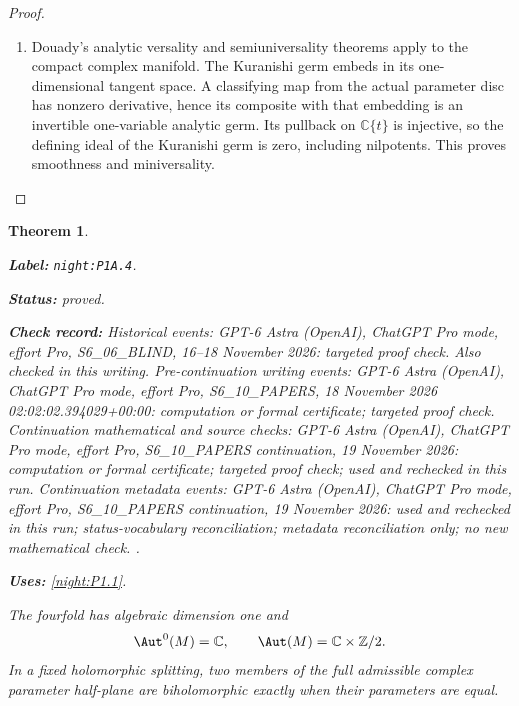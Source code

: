 \documentclass[11pt,a4paper]{article}
\newtheorem{theorem}{Theorem}[section]
\theoremstyle{definition}
\newcommand{\StatementRecord}[4]{\par\smallskip\begingroup\upshape\raggedright\noindent\textbf{Label:} \nolinkurl{#1}.\par\noindent\textbf{Status:} #2.\par\noindent\textbf{Check record:} #3.\par\noindent\textbf{Uses:} #4.\par\endgroup\smallskip}
\begin{document}
\begin{proof}
\begin{enumerate}[label=\arabic*.]
\item Douady's analytic versality and semiuniversality theorems
\cite[\S VII.8, pp.~598--599; \S VIII.1, pp.~599--600]{Douady1974} apply to the
compact complex manifold. The Kuranishi germ embeds in its
one-dimensional tangent space. A classifying map from the
actual parameter disc has nonzero derivative, hence its
composite with that embedding is an invertible one-variable
analytic germ. Its pullback on $\mathbb C\{t\}$ is injective,
so the defining ideal of the Kuranishi germ is zero, including
nilpotents. This proves smoothness and miniversality.

\end{enumerate}
\end{proof}




\begin{theorem}\label{night:P1A.4}
\StatementRecord{night:P1A.4}{proved}{Historical events: GPT-6 Astra (OpenAI), ChatGPT Pro mode, effort Pro, S6\_06\_BLIND, 16--18 November 2026: targeted proof check. Also checked in this writing. Pre-continuation writing events: GPT-6 Astra (OpenAI), ChatGPT Pro mode, effort Pro, S6\_10\_PAPERS, 18 November 2026 02:02:02.394029+00:00: computation or formal certificate; targeted proof check. Continuation mathematical and source checks: GPT-6 Astra (OpenAI), ChatGPT Pro mode, effort Pro, S6\_10\_PAPERS continuation, 19 November 2026: computation or formal certificate; targeted proof check; used and rechecked in this run. Continuation metadata events: GPT-6 Astra (OpenAI), ChatGPT Pro mode, effort Pro, S6\_10\_PAPERS continuation, 19 November 2026: used and rechecked in this run; status-vocabulary reconciliation; metadata reconciliation only; no new mathematical check. }{\cref{night:P1.1}}
The fourfold has algebraic dimension one and
\[
\Aut^0(M)=\mathbb C,\qquad
\Aut(M)=\mathbb C\times\mathbb Z/2.
\]
In a fixed holomorphic splitting, two members of the full
admissible complex parameter half-plane are biholomorphic
exactly when their parameters are equal.
\end{theorem}
\end{document}
